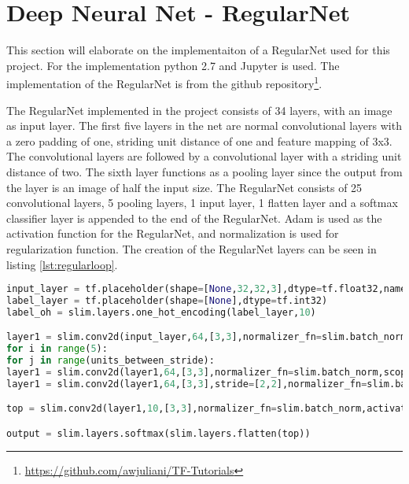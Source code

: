 \section{Deep Neural Net - RegularNet}

This section will elaborate on the implementaiton of a RegularNet used for this project. For the implementation python 2.7 and Jupyter is used. The implementation of the RegularNet is from the github repository\footnote{\url{https://github.com/awjuliani/TF-Tutorials}}. 

The RegularNet implemented in the project consists of 34 layers, with an image as input layer. The first five layers in the net are normal convolutional layers with a zero padding of one, striding unit distance of one and feature mapping of 3x3. The convolutional layers are followed by a convolutional layer with a striding unit distance of two. The sixth layer functions as a pooling layer since the output from the layer is an image of half the input size. The RegularNet consists of 25 convolutional layers, 5 pooling layers, 1 input layer, 1 flatten layer and a softmax classifier layer is appended to the end of the RegularNet. Adam is used as the activation function for the RegularNet, and normalization is used for regularization function. The creation of the RegularNet layers can be seen in listing \ref{lst:regularloop}.

\begin{lstlisting}[language=Python, label=lst:regularloop, caption=For loop that creates the layers in the RegularNet]
input_layer = tf.placeholder(shape=[None,32,32,3],dtype=tf.float32,name='input')
label_layer = tf.placeholder(shape=[None],dtype=tf.int32)
label_oh = slim.layers.one_hot_encoding(label_layer,10)

layer1 = slim.conv2d(input_layer,64,[3,3],normalizer_fn=slim.batch_norm,scope='conv_'+str(0))
for i in range(5):
for j in range(units_between_stride):
layer1 = slim.conv2d(layer1,64,[3,3],normalizer_fn=slim.batch_norm,scope='conv_'+str((j+1) + (i*units_between_stride)))
layer1 = slim.conv2d(layer1,64,[3,3],stride=[2,2],normalizer_fn=slim.batch_norm,scope='conv_s_'+str(i))

top = slim.conv2d(layer1,10,[3,3],normalizer_fn=slim.batch_norm,activation_fn=None,scope='conv_top')

output = slim.layers.softmax(slim.layers.flatten(top))
\end{lstlisting}

